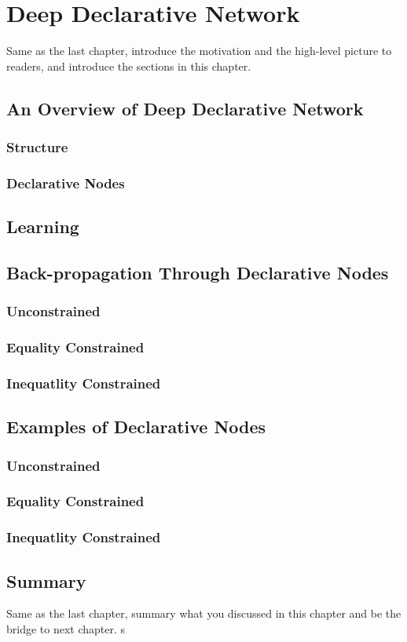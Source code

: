 \chapter{Deep Declarative Network}
\label{cha:ddn}
Same as the last chapter, introduce the motivation and the high-level picture to
readers, and introduce the sections in this chapter.


\section{An Overview of Deep Declarative Network}
\subsection{Structure}
\subsection{Declarative Nodes}

\section{Learning}


\section{Back-propagation Through Declarative Nodes}

\subsection{Unconstrained}
\subsection{Equality Constrained}
\subsection{Inequatlity Constrained}

\section{Examples of Declarative Nodes}
\subsection{Unconstrained}

\subsection{Equality Constrained}

\subsection{Inequatlity Constrained}

\section{Summary}
Same as the last chapter, summary what you discussed in this chapter and
be the bridge to next chapter.
s
